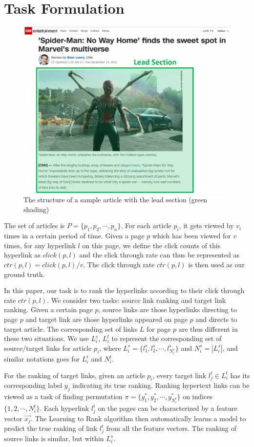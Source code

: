\section {Task Formulation}

\begin{figure}[t]
\centering
\includegraphics[width=1\columnwidth]{vis_example1}
\caption{The structure of a sample article with the lead section (green shading)}
\label{vis_example1}
\end{figure}

The set of articles is $P = \{p_1, p_2, \cdots, p_n\}$. For each article $p_i$, it gets viewed by $v_i$ times in a certain period of time. Given a page $p$ which has been viewed for $v$ times, for any hyperlink $l$ on this page, we define the click counts of this hyperlink as $click(p, l)$ and the click through rate can thus be represented as $ctr(p,l) = click(p,l) / v$. The click through rate $ctr(p, l)$ is then used as our ground truth.

In this paper, our task is to rank the hyperlinks according to their click through rate $ctr(p,l)$. We consider two tasks: source link ranking and target link ranking. Given a certain page $p$, source links are those hyperlinks directing to page $p$ and target link are those hyperlinks appeared on page $p$ and directs to target article. The corresponding set of links $L$ for page $p$ are thus different in these two situations. We use $L^s_i$, $L^t_i$ to represent the corresponding set of source/target links for article $p_i$, where $L^s_i = \{l^s_1, l^s_2, \cdots, l^s_{N^s_i}\}$ and $N^s_i = |L^s_i|$, and similar notations goes for $L^t_i$ and $N^t_i$. 

For the ranking of target links, given an article $p_i$, every target link $l^t_j \in L^t_i$ has its corresponding label $y_j$ indicating its true ranking. Ranking hypertext links can be viewed as a task of finding permutation $\pi = \{y
^*_1, y^*_2, \cdots, y^*_{N^t_i}\}$ on indices $\{1,2,\cdots,N^t_i\}$. Each hyperlink $l^t_j$ on the pages can be characterized by a feature vector $\vec{x_j}$. The Learning to Rank algorithm then automatically learns a model to predict the true ranking of link $l^t_j$ from all the feature vectors. The ranking of source links is similar, but within $L^s_i$.
